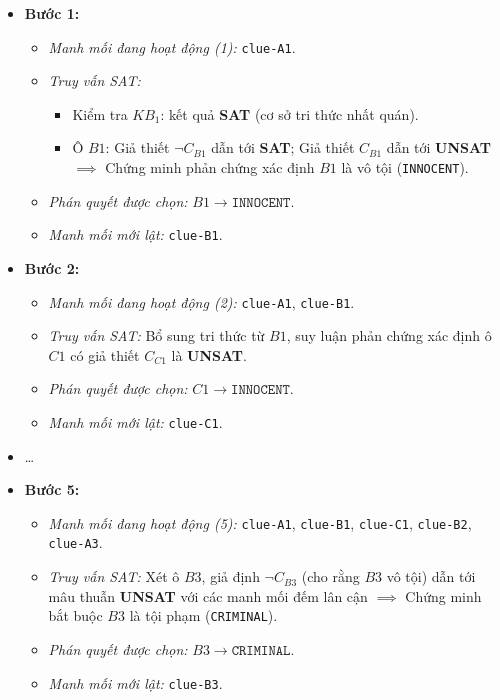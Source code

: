 \begin{itemize}
    \item \textbf{Bước 1:}
    \begin{itemize}
        \item \textit{Manh mối đang hoạt động (1):} \texttt{clue-A1}.
        \item \textit{Truy vấn SAT:}
        \begin{itemize}
            \item Kiểm tra $KB_1$: kết quả \textbf{SAT} (cơ sở tri thức nhất quán).
            \item Ô $B1$: Giả thiết $\neg C_{B1}$ dẫn tới \textbf{SAT}; Giả thiết $C_{B1}$ dẫn tới \textbf{UNSAT} $\implies$ Chứng minh phản chứng xác định $B1$ là vô tội (\texttt{INNOCENT}).
        \end{itemize}
        \item \textit{Phán quyết được chọn:} $B1 \to \texttt{INNOCENT}$.
        \item \textit{Manh mối mới lật:} \texttt{clue-B1}.
    \end{itemize}

    \item \textbf{Bước 2:}
    \begin{itemize}
        \item \textit{Manh mối đang hoạt động (2):} \texttt{clue-A1}, \texttt{clue-B1}.
        \item \textit{Truy vấn SAT:} Bổ sung tri thức từ $B1$, suy luận phản chứng xác định ô $C1$ có giả thiết $C_{C1}$ là \textbf{UNSAT}.
        \item \textit{Phán quyết được chọn:} $C1 \to \texttt{INNOCENT}$.
        \item \textit{Manh mối mới lật:} \texttt{clue-C1}.
    \end{itemize}

    \item \dots
    \item \textbf{Bước 5:}
    \begin{itemize}
        \item \textit{Manh mối đang hoạt động (5):} \texttt{clue-A1}, \texttt{clue-B1}, \texttt{clue-C1}, \texttt{clue-B2}, \texttt{clue-A3}.
        \item \textit{Truy vấn SAT:} Xét ô $B3$, giả định $\neg C_{B3}$ (cho rằng $B3$ vô tội) dẫn tới mâu thuẫn \textbf{UNSAT} với các manh mối đếm lân cận $\implies$ Chứng minh bắt buộc $B3$ là tội phạm (\texttt{CRIMINAL}).
        \item \textit{Phán quyết được chọn:} $B3 \to \texttt{CRIMINAL}$.
        \item \textit{Manh mối mới lật:} \texttt{clue-B3}.
    \end{itemize}
\end{itemize}

